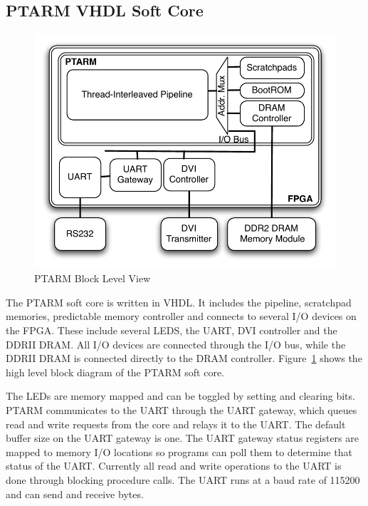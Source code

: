 \subsection{PTARM VHDL Soft Core}
\label{sec:ptarm_vhdl_soft_core}
\begin{figure}
  \vspace{-20pt}
  \begin{center}
    \includegraphics[scale=.6]{figs/ptarm_vhdl_high_level}
  \end{center}
  \vspace{-20pt}
  \caption{PTARM Block Level View}
  \label{fig:ptarm_vhdl_high_level}
  \vspace{-10pt}
\end{figure}   
The PTARM soft core is written in VHDL.
It includes the pipeline, scratchpad memories, predictable memory controller and connects to several I/O devices on the FPGA.
These include several LEDS, the UART, DVI controller and the DDRII DRAM.
All I/O devices are connected through the I/O bus, while the DDRII DRAM is connected directly to the DRAM controller.
Figure~\ref{fig:ptarm_vhdl_high_level} shows the high level block diagram of the PTARM soft core.

The LEDs are memory mapped and can be toggled by setting and clearing bits.
PTARM communicates to the UART through the UART gateway, which queues read and write requests from the core and relays it to the UART.
The default buffer size on the UART gateway is one.
The UART gateway status registers are mapped to memory I/O locations so programs can poll them to determine that status of the UART.  
Currently all read and write operations to the UART is done through blocking procedure calls. 
The UART runs at a baud rate of 115200 and can send and receive bytes.

